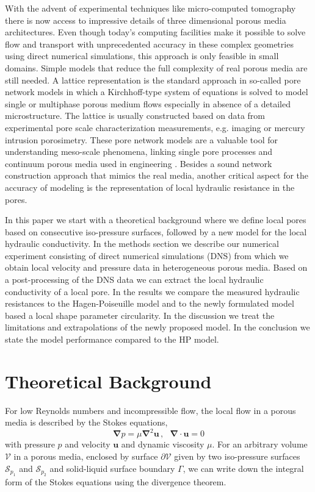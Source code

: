 \documentclass[draft]{agujournal2019}
\begin{document}
With the advent of experimental techniques like micro-computed tomography there is now access to impressive details of three dimensional porous media architectures. Even though today's computing facilities make it possible to solve flow and transport with unprecedented accuracy in these complex geometries using direct numerical simulations, this approach is only feasible in small domains. Simple models that reduce the full complexity of real porous media are still needed. A lattice representation is the standard approach in so-called pore network models in which a Kirchhoff-type system of equations is solved to model single or multiphase porous medium flows \cite{thompson_modeling_1997} especially in absence of a detailed microstructure. The lattice is usually constructed based on data from experimental pore scale characterization measurements, e.g. imaging or mercury intrusion porosimetry. These pore network models are a valuable tool for understanding meso-scale phenomena, linking single pore processes and continuum porous media used in engineering \cite{xiong_review_2016}. Besides a sound network construction approach that mimics the real media, another critical aspect for the accuracy of modeling is the representation of local hydraulic resistance in the pores. 


In this paper we start with a theoretical background where we define local pores based on consecutive iso-pressure surfaces, followed by a new model for the local hydraulic conductivity. In the methods section we describe our numerical experiment consisting of direct numerical simulations (DNS) from which we obtain local velocity and pressure data in heterogeneous porous media. Based on a post-processing of the DNS data we can extract the local hydraulic conductivity of a local pore. In the results we compare the measured hydraulic resistances to the Hagen-Poiseuille model and to the newly formulated model based a local shape parameter circularity. In the discussion we treat the limitations and extrapolations of the newly proposed model. In the conclusion we state the model performance compared to the HP model.



\section{Theoretical Background}

For low Reynolds numbers and incompressible flow, the local flow in a porous media is described by the Stokes equations,
\begin{equation}
	\mathbf{\nabla} p =  \mu\mathbf{\nabla}^2 \mathbf{u}\,,~~~\mathbf{\nabla}\cdot\mathbf{u}=0\label{eq:stokes_local}
	\end{equation}
with pressure $p$ and velocity $\mathbf{u}$ and dynamic viscosity $\mu$. For an arbitrary volume $\mathcal{V}$ in a porous media, enclosed by surface $\partial \mathcal{V}$ given by two iso-pressure surfaces $\mathcal{S}_{p_1}$ and $\mathcal{S}_{p_2}$ and solid-liquid surface boundary $\Gamma$, we can write down the integral form of the Stokes equations using the divergence theorem. 
\end{document}
